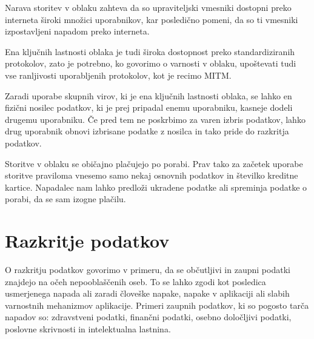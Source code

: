 \documentclass[12pt,a4paper,openany,tikz]{book}
\theoremstyle{plain}
\theoremstyle{definition}
\begin{document}
\begin{description}[style=nextline]

\item[Nedovoljen dostop do upraviteljskega in programskega vmesnika] Narava storitev v oblaku zahteva da so upraviteljski vmesniki dostopni preko interneta široki množici uporabnikov, kar posledično pomeni, da so ti vmesniki izpostavljeni napadom preko interneta.

\item[Ranljivosti Internetnega protokola] Ena ključnih lastnosti oblaka je tudi široka dostopnost preko standardiziranih protokolov, zato je potrebno, ko govorimo o varnosti v oblaku, upoštevati tudi vse ranljivosti uporabljenih protokolov, kot je recimo \gls{MITM}.

\item[Ranljivosti obnovitve podatkov] Zaradi uporabe skupnih virov, ki je ena ključnih lastnosti oblaka, se lahko en fizični nosilec podatkov, ki je prej pripadal enemu uporabniku, kasneje dodeli drugemu uporabniku. Če pred tem ne poskrbimo za varen izbris podatkov, lahko drug uporabnik obnovi izbrisane podatke z nosilca in tako pride do razkritja podatkov.

\item[Izogibanje merjenju in plačilu] Storitve v oblaku se običajno plačujejo po porabi. Prav tako za začetek uporabe storitve praviloma vnesemo samo nekaj osnovnih podatkov in številko kreditne kartice. Napadalec nam lahko predloži ukradene podatke ali spreminja podatke o porabi, da se sam izogne plačilu.

\end{description}


\section{Razkritje podatkov}
\label{sub:Razkritje podatkov}

O razkritju podatkov govorimo v primeru, da se občutljivi in zaupni podatki znajdejo na očeh nepooblaščenih oseb.  To se lahko zgodi kot posledica usmerjenega napada ali zaradi človeške napake, napake v aplikaciji ali slabih varnostnih mehanizmov aplikacije. Primeri zaupnih podatkov, ki so pogosto tarča napadov so: zdravstveni podatki, finančni podatki, osebno določljivi podatki, poslovne skrivnosti in intelektualna lastnina.
\end{document}
